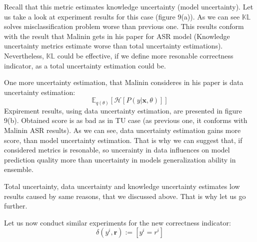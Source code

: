 \documentclass[a4paper,14pt]{extarticle}
\begin{document}
	Recall that this metric estimates knowledge uncertainty (model uncertainty). Let us take a look at experiment results for this case (figure 9(a)). As we can see $\mathbb{KL}$ solves misclassification problem worse than previous one. This results conform with the result that Malinin gets in his paper for ASR model (Knowledge uncertainty metrics estimate worse than total uncertainty estimations). Nevertheless, $\mathbb{KL}$ could be effective, if we define more resonable correctness indicator, as a total uncertainty estimation could be. 
	
	One more uncertainty estimation, that Malinin consideres in his paper is data uncertainty estimation:
	\begin{equation*}
		\mathbb{E}_{q(\theta)}[\mathcal{H}[P(y| \textbf{x}, \theta)]]
	\end{equation*}
	Expirement results, using data uncertainty estimation, are presented in figure 9(b). Obtained score is as bad as in TU case (as previous one, it conforms with Malinin ASR results). As we can see, data uncertainty estimation gains more score, than model uncertainty estimation. That is why we can suggest that, if considered metrics is resonable, so uncerainty in data influences on model prediction quality more than uncertainty in models generalization ability in ensemble.
	
	Total uncertainty, data uncertainty and knowledge uncertainty estimates low results caused by same reasons, that we discussed above. That is why let us go further.
	
	Let us now conduct similar experiments for the new correctness indicator:
	\begin{equation}
		\delta(y^i, \textbf{r}) := [y^i = r^i]
	\end{equation}
	
\end{document}
